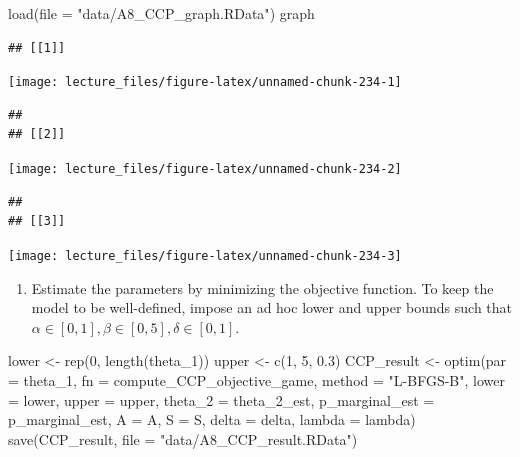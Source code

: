 \documentclass[
]{book}
\newenvironment{Shaded}{\begin{snugshade}}{\end{snugshade}}
\newcommand{\AttributeTok}[1]{\textcolor[rgb]{0.77,0.63,0.00}{#1}}
\newcommand{\DecValTok}[1]{\textcolor[rgb]{0.00,0.00,0.81}{#1}}
\newcommand{\FloatTok}[1]{\textcolor[rgb]{0.00,0.00,0.81}{#1}}
\newcommand{\FunctionTok}[1]{\textcolor[rgb]{0.00,0.00,0.00}{#1}}
\newcommand{\NormalTok}[1]{#1}
\newcommand{\OtherTok}[1]{\textcolor[rgb]{0.56,0.35,0.01}{#1}}
\newcommand{\StringTok}[1]{\textcolor[rgb]{0.31,0.60,0.02}{#1}}
\providecommand{\tightlist}{%
  \setlength{\itemsep}{0pt}\setlength{\parskip}{0pt}}
\begin{document}
\begin{Shaded}
\begin{Highlighting}[]
\FunctionTok{load}\NormalTok{(}\AttributeTok{file =} \StringTok{"data/A8\_CCP\_graph.RData"}\NormalTok{)}
\NormalTok{graph}
\end{Highlighting}
\end{Shaded}

\begin{verbatim}
## [[1]]
\end{verbatim}

\begin{center}\texttt{[image: lecture\_files/figure-latex/unnamed-chunk-234-1]} \end{center}

\begin{verbatim}
## 
## [[2]]
\end{verbatim}

\begin{center}\texttt{[image: lecture\_files/figure-latex/unnamed-chunk-234-2]} \end{center}

\begin{verbatim}
## 
## [[3]]
\end{verbatim}

\begin{center}\texttt{[image: lecture\_files/figure-latex/unnamed-chunk-234-3]} \end{center}

\begin{enumerate}
\def\labelenumi{\arabic{enumi}.}
\setcounter{enumi}{3}
\tightlist
\item
  Estimate the parameters by minimizing the objective function. To keep the model to be well-defined, impose an ad hoc lower and upper bounds such that \(\alpha \in [0, 1], \beta \in [0, 5], \delta \in [0, 1]\).
\end{enumerate}

\begin{Shaded}
\begin{Highlighting}[]
\NormalTok{lower }\OtherTok{\textless{}{-}} \FunctionTok{rep}\NormalTok{(}\DecValTok{0}\NormalTok{, }\FunctionTok{length}\NormalTok{(theta\_1))}
\NormalTok{upper }\OtherTok{\textless{}{-}} \FunctionTok{c}\NormalTok{(}\DecValTok{1}\NormalTok{, }\DecValTok{5}\NormalTok{, }\FloatTok{0.3}\NormalTok{)}
\NormalTok{CCP\_result }\OtherTok{\textless{}{-}}
  \FunctionTok{optim}\NormalTok{(}\AttributeTok{par =}\NormalTok{ theta\_1,}
        \AttributeTok{fn =}\NormalTok{ compute\_CCP\_objective\_game,}
        \AttributeTok{method =} \StringTok{"L{-}BFGS{-}B"}\NormalTok{,}
        \AttributeTok{lower =}\NormalTok{ lower,}
        \AttributeTok{upper =}\NormalTok{ upper,}
        \AttributeTok{theta\_2 =}\NormalTok{ theta\_2\_est,}
        \AttributeTok{p\_marginal\_est =}\NormalTok{ p\_marginal\_est,}
        \AttributeTok{A =}\NormalTok{ A,}
        \AttributeTok{S =}\NormalTok{ S,}
        \AttributeTok{delta =}\NormalTok{ delta,}
        \AttributeTok{lambda =}\NormalTok{ lambda)}
\FunctionTok{save}\NormalTok{(CCP\_result, }\AttributeTok{file =} \StringTok{"data/A8\_CCP\_result.RData"}\NormalTok{)}
\end{Highlighting}
\end{Shaded}
\end{document}
